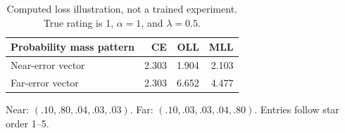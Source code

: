 \begin{table}[t]
\caption{Computed loss illustration, not a trained experiment. True rating is 1, $\alpha=1$, and $\lambda=0.5$.}
\label{tab:loss}
\centering\footnotesize
\begin{tabular}{@{}lrrr@{}}
\toprule
Probability mass pattern & CE & OLL & MLL\\\midrule
Near-error vector & 2.303 & 1.904 & 2.103\\
Far-error vector & 2.303 & 6.652 & 4.477\\
\bottomrule
\end{tabular}
\par\smallskip\parbox{\columnwidth}{\scriptsize Near: $(.10,.80,.04,.03,.03)$. Far: $(.10,.03,.03,.04,.80)$. Entries follow star order 1--5.}
\end{table}
